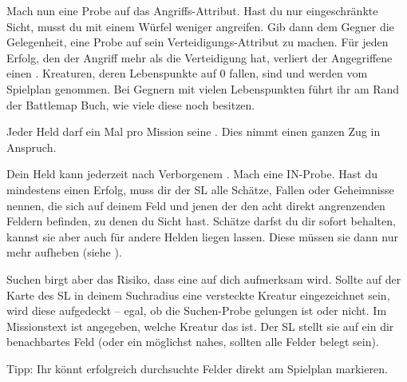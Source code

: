 {			Mach nun eine Probe auf das Angriffs-Attribut. Hast du nur eingeschränkte Sicht, musst du mit einem Würfel weniger angreifen. Gib dann dem Gegner die Gelegenheit, eine Probe auf sein Verteidi\-gungs-Attribut zu machen. Für jeden Erfolg, den der Angriff mehr als die Verteidigung hat, verliert der Angegriffene einen . Kreaturen, deren Lebenspunkte auf 0 fallen, sind  und werden vom Spielplan genommen. Bei Gegnern mit vielen Lebenspunkten führt ihr am Rand der Battlemap Buch, wie viele diese noch besitzen.

			Jeder Held darf ein Mal pro Mission seine . Dies nimmt einen ganzen Zug in Anspruch.

			Dein Held kann jederzeit nach Verborgenem . Mach eine IN-Probe. Hast du mindestens einen Erfolg, muss dir der SL alle Schätze, Fallen oder Geheimnisse nennen, die sich auf deinem Feld und jenen der den acht direkt angrenzenden Feldern befinden, zu denen du Sicht hast. Schätze darfst du dir sofort behalten, kannst sie aber auch für andere Helden liegen lassen. Diese müssen sie dann nur mehr aufheben (siehe ).

			Suchen birgt aber das Risiko, dass eine  auf dich aufmerksam wird. Sollte auf der Karte des SL in deinem Suchradius eine versteckte Kreatur eingezeichnet sein, wird diese aufgedeckt -- egal, ob die Suchen-Probe gelungen ist oder nicht. Im Missionstext ist angegeben, welche Kreatur das ist. Der SL stellt sie auf ein dir benachbartes Feld (oder ein möglichst nahes, sollten alle Felder belegt sein).

			Tipp: Ihr könnt erfolgreich durchsuchte Felder direkt am Spielplan markieren.
}

